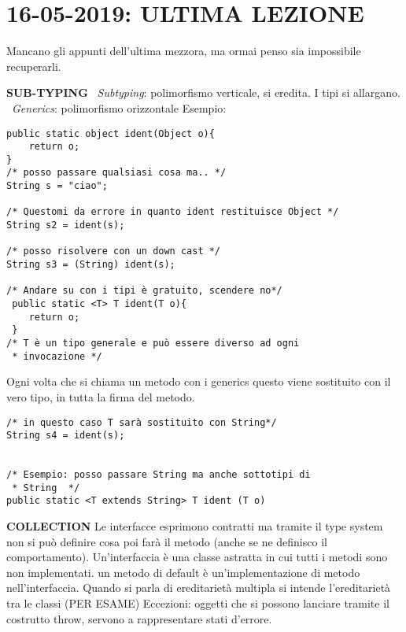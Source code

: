 \newpage
\section{16-05-2019: ULTIMA LEZIONE}
\noindent Mancano gli appunti dell'ultima mezzora, ma ormai penso sia impossibile recuperarli. \newline

\noindent \textbf{SUB-TYPING} \newline
\textbullet\ \textit{Subtyping}: polimorfismo verticale, si eredita. I tipi si allargano. \newline
\textbullet\ \textit{Generics}: polimorfismo orizzontale \newline
\noindent Esempio:
\begin{lstlisting}
public static object ident(Object o){
	return o;
}
/* posso passare qualsiasi cosa ma.. */
String s = "ciao";

/* Questomi da errore in quanto ident restituisce Object */
String s2 = ident(s); 

/* posso risolvere con un down cast */
String s3 = (String) ident(s);

/* Andare su con i tipi è gratuito, scendere no*/
 public static <T> T ident(T o){
 	return o;
 }
/* T è un tipo generale e può essere diverso ad ogni
 * invocazione */
\end{lstlisting}


\noindent Ogni volta che si chiama un metodo con i generics questo viene sostituito con il vero tipo, in tutta la firma del metodo.
\begin{lstlisting}
/* in questo caso T sarà sostituito con String*/
String s4 = ident(s);


/* Esempio: posso passare String ma anche sottotipi di
 * String  */
public static <T extends String> T ident (T o)
\end{lstlisting}

\noindent \textbf{COLLECTION} \newline
Le interfacce esprimono contratti ma tramite il type system non si può definire cosa poi farà il metodo (anche se ne definisco il comportamento).\newline
Un'interfaccia è una classe astratta in cui tutti i metodi sono non implementati. \newline
un metodo di default è un'implementazione di metodo nell'interfaccia. \newline
Quando si parla di ereditarietà multipla si intende l'ereditarietà tra le classi (PER ESAME) \newline
Eccezioni: oggetti che si possono lanciare tramite il costrutto throw, servono a rappresentare stati d'errore.